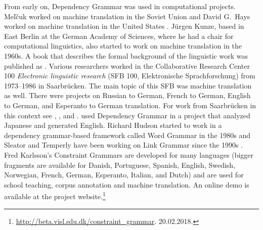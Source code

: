 From early on, Dependency Grammar was used in computational projects. Meľčuk worked on machine
translation in the Soviet Union \citep{Melcuk64a-u} and David G.\ Hays worked on machine translation
in the United States \citep{HZ60a-u}. Jürgen Kunze, based in East Berlin at the German Academy of
Sciences, where he had a chair for computational linguistics, also started to work on machine
translation in the 1960s. A book that describes the formal background of the linguistic work was
published as .  Various researchers worked in the Collaborative Research Center
100 \emph{Electronic linguistic research} (SFB 100, Elektronische Sprachforschung) from 1973--1986
in Saarbrücken. The main topic of this SFB was machine translation as well. There were projects on
Russian to German, French to German, English to German, and
Esperanto to German translation. For work from Saarbrücken in
this context see , , and .
\citet{MIF85a} used Dependency Grammar in a project that analyzed Japanese and
generated English.
Richard Hudson started to work in a dependency grammar-based framework called Word Grammar\indexwg
in the 1980s \citep{Hudson84a-u,Hudson2007a-u} and Sleator and Temperly have been working on Link
Grammar since the 1990s \citep{ST91a-u,GLS95a-u}.
Fred Karlsson's Constraint Grammars \citeyearpar{Karlsson90a-u} are developed for many languages (bigger fragments are available
for Danish, Portuguese, Spanish, English, Swedish, Norwegian, French, German, Esperanto, Italian, and
Dutch) and are used for school teaching,
corpus annotation and machine translation. An online
demo is available at the project website.\footnote{%
  \url{http://beta.visl.sdu.dk/constraint_grammar}. 20.02.2018.
}






%

